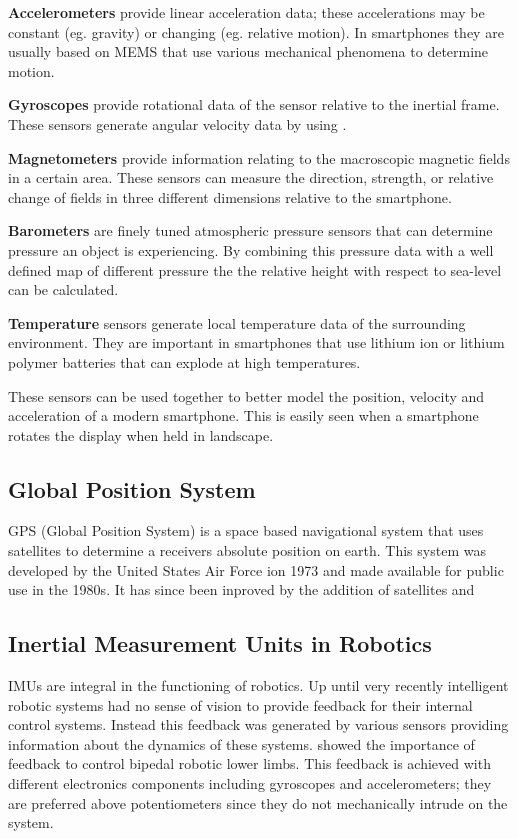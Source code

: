 \textbf{Accelerometers} provide linear acceleration data; these accelerations may be constant (eg. gravity) or changing (eg. relative motion). In smartphones they are usually based on MEMS that use various mechanical phenomena to determine motion. 

\textbf{Gyroscopes} provide rotational data of the sensor relative to the inertial frame.  These sensors generate angular velocity data by using .

\textbf{Magnetometers} provide information relating to the macroscopic magnetic fields in a certain area. These sensors can measure the direction, strength, or relative change of fields in three different dimensions relative to the smartphone. 

\textbf{Barometers} are finely tuned atmospheric pressure sensors that can determine pressure an object is experiencing. By combining this pressure data with a well defined map of different pressure the the relative height with respect to sea-level can be calculated.

\textbf{Temperature} sensors generate local temperature data of the surrounding environment. They are important in smartphones that use lithium ion or lithium polymer batteries that can explode at high temperatures.

These sensors can be used together to better model the position, velocity and acceleration of a modern smartphone. This is easily seen when a smartphone rotates the display when held in landscape.


\subsection{Global Position System}
GPS (Global Position System) is a space based navigational system that uses satellites to determine a receivers absolute position on earth. This system was developed by the United States Air Force ion 1973 and made available for public use in the 1980s. It has since been inproved by the addition of satellites and 


\subsection{Inertial Measurement Units in Robotics}
IMUs are integral in the functioning of robotics. Up until very recently intelligent robotic systems had no sense of vision to provide feedback for their internal control systems. Instead this feedback was generated by various sensors providing information about the dynamics of these systems. \cite{kaneko2002legs} showed the importance of feedback to control bipedal robotic lower limbs. This feedback is achieved with different electronics components including gyroscopes and accelerometers; they are preferred above potentiometers since they do not mechanically intrude on the system.


